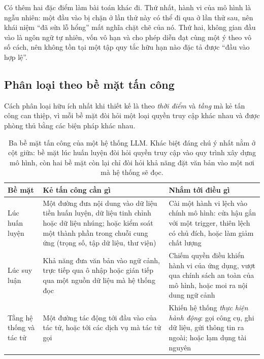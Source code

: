 Có thêm hai đặc điểm làm bài toán khác đi. Thứ nhất, hành vi của mô hình là ngẫu nhiên: một đầu vào bị chặn ở lần thử này có thể đi qua ở lần thử sau, nên khái niệm ``đã sửa lỗ hổng'' mất nghĩa chặt chẽ của nó. Thứ hai, không gian đầu vào là ngôn ngữ tự nhiên, vốn vô hạn và cho phép diễn đạt cùng một ý theo vô số cách, nên không tồn tại một tập quy tắc hữu hạn nào đặc tả được ``đầu vào hợp lệ''.

\subsection{Phân loại theo bề mặt tấn công}
\label{ssec:attack_surfaces}

Cách phân loại hữu ích nhất khi thiết kế là theo \emph{thời điểm} và \emph{tầng} mà kẻ tấn công can thiệp, vì mỗi bề mặt đòi hỏi một loại quyền truy cập khác nhau và được phòng thủ bằng các biện pháp khác nhau.

\begin{table}[H]
	\centering
	\small
	\begin{tabularx}{\textwidth}{@{}l>{\raggedright\arraybackslash}X>{\raggedright\arraybackslash}X@{}}
		\toprule
		\textbf{Bề mặt} & \textbf{Kẻ tấn công cần gì} & \textbf{Nhắm tới điều gì} \\
		\midrule
		Lúc huấn luyện &
		Một đường đưa nội dung vào dữ liệu tiền huấn luyện, dữ liệu tinh chỉnh hoặc dữ liệu nhúng; hoặc kiểm soát một thành phần trong chuỗi cung ứng (trọng số, tập dữ liệu, thư viện) &
		Cài một hành vi lệch vào chính mô hình: cửa hậu gắn với một trigger, thiên lệch có chủ đích, hoặc làm giảm chất lượng \\
		\addlinespace
		Lúc suy luận &
		Khả năng đưa văn bản vào ngữ cảnh, trực tiếp qua ô nhập hoặc gián tiếp qua một nguồn dữ liệu mà hệ thống đọc &
		Chiếm quyền điều khiển hành vi của ứng dụng, vượt qua chính sách an toàn của mô hình, hoặc moi ra nội dung ngữ cảnh \\
		\addlinespace
		Tầng hệ thống và tác tử &
		Một đường tác động tới đầu vào của tác tử, hoặc tới các dịch vụ mà tác tử gọi &
		Khiến hệ thống \emph{thực hiện hành động}: gọi công cụ, ghi dữ liệu, gửi thông tin ra ngoài; hoặc lạm dụng tài nguyên \\
		\bottomrule
	\end{tabularx}
	\caption{Ba bề mặt tấn công của một hệ thống LLM. Khác biệt đáng chú ý nhất nằm ở cột giữa: bề mặt lúc huấn luyện đòi hỏi quyền truy cập vào quy trình xây dựng mô hình, còn hai bề mặt còn lại chỉ đòi hỏi khả năng đặt văn bản vào một nơi mà hệ thống sẽ đọc.}
	\label{tab:llm_attack_surfaces}
\end{table}

